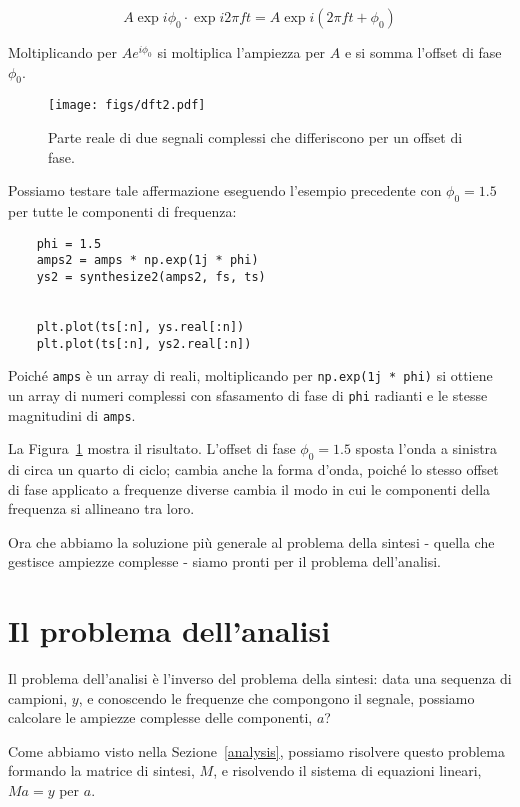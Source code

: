 \documentclass[12pt,a4paper]{book}
\begin{document}
%
\[ A \exp{i \phi_0} \cdot \exp{i 2 \pi f t} = A \exp{i (2 \pi f t + \phi_0)} \] 

%
Moltiplicando per $A e^{i \phi_0}$ si moltiplica l'ampiezza per $A$ e si somma l'offset di fase $\phi_0$.

\begin{figure} 

\centerline{\texttt{[image: figs/dft2.pdf]}} \caption{Parte reale di due segnali complessi che differiscono per un offset di fase.} \label{fig.dft2} \end{figure} 

Possiamo testare tale affermazione eseguendo l'esempio precedente con $\phi_0 = 1.5$ per tutte le componenti di frequenza:

\begin{verbatim} 
    phi = 1.5
    amps2 = amps * np.exp(1j * phi)
    ys2 = synthesize2(amps2, fs, ts)


    plt.plot(ts[:n], ys.real[:n])
    plt.plot(ts[:n], ys2.real[:n])
 \end{verbatim} 

Poiché {\tt amps} è un array di reali, moltiplicando per {\tt np.exp(1j * phi)} si ottiene un array di numeri complessi con sfasamento di fase di {\tt phi} radianti e le stesse magnitudini di {\tt amps}.

La Figura~\ref{fig.dft2} mostra il risultato. L'offset di fase $\phi_0 = 1.5$ sposta l'onda a sinistra di circa un quarto di ciclo; cambia anche la forma d'onda, poiché lo stesso offset di fase applicato a frequenze diverse cambia il modo in cui le componenti della frequenza si allineano tra loro.

Ora che abbiamo la soluzione più generale al problema della sintesi - quella che gestisce ampiezze complesse - siamo pronti per il problema dell'analisi.

\section{Il problema dell'analisi} 

Il problema dell'analisi è l'inverso del problema della sintesi: data una sequenza di campioni, $y$, e conoscendo le frequenze che compongono il segnale, possiamo calcolare le ampiezze complesse delle componenti, $a$?

Come abbiamo visto nella Sezione~\ref{analysis}, possiamo risolvere questo problema formando la matrice di sintesi, $M$, e risolvendo il sistema di equazioni lineari, $M a = y$ per $a$.
\end{document}
